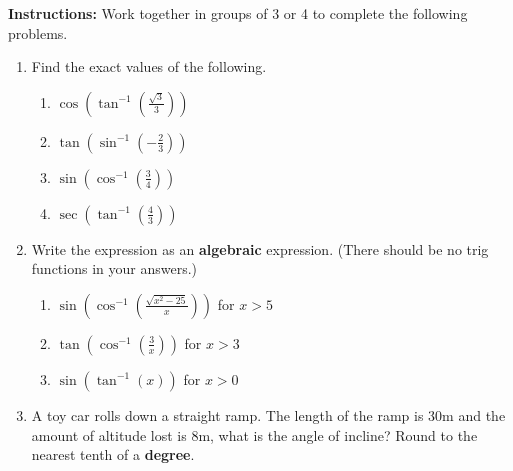 


\noindent \textbf{Instructions:}  Work together in groups of  3 or 4 to complete the following problems.\\

\begin{enumerate}

\item Find the exact values of the following.
\begin{enumerate}

\item $\cos \left( \tan^{-1}\left(\frac{\sqrt{3}}{3}\right)\right)$

\vfill
\item $\tan \left( \sin^{-1}\left(-\frac{2}{3}\right)\right)$


\vfill

\item $\sin \left( \cos^{-1}\left(\frac{3}{4}\right)\right)$
\vfill

\item $\sec \left( \tan^{-1}\left(\frac{4}{3}\right)\right)$
\vfill

\end{enumerate}



\clearpage
\item Write the expression as an \textbf{algebraic} expression.
  (There should be no trig functions in your answers.)

\begin{enumerate}

\item $\displaystyle \sin \left( \cos^{-1}\left(\frac{\sqrt{x^2-25}}{x}\right)\right)$ for $x>5$

\vfill

\item $\displaystyle \tan \left( \cos^{-1}\left(\frac{3}{x}\right)\right)$ for $x>3$
\vfill

\item $\displaystyle \sin \left( \tan^{-1}\left(x\right)\right)$ for $x>0$
\vfill


\end{enumerate}


\clearpage

\item A toy car rolls down a straight ramp. The length of the ramp is
  30m and the amount of altitude lost is 8m, what is the angle of
  incline?  Round to the nearest tenth of a \textbf{degree}.


\end{enumerate}
